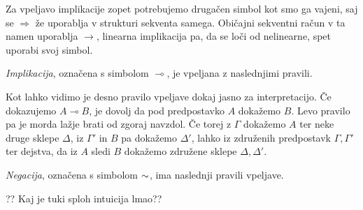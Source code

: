 Za vpeljavo implikacije zopet potrebujemo drugačen simbol kot smo ga vajeni, saj se $\Rightarrow$ že uporablja v strukturi sekventa samega. Običajni sekventni račun v ta namen uporablja $\rightarrow$, linearna implikacija pa, da se loči od nelinearne, spet uporabi svoj simbol.

\begin{definicija}
	\emph{Implikacija}, označena s simbolom $\multimap$, je vpeljana z naslednjimi pravili.
    \begin{center}
        \begin{bprooftree}
        \end{bprooftree}
        \begin{bprooftree}
        \end{bprooftree}
    \end{center}
    Kot lahko vidimo je desno pravilo vpeljave dokaj jasno za interpretacijo. Če dokazujemo $A \multimap B$, je dovolj da pod predpostavko $A$ dokažemo $B$. Levo pravilo pa je morda lažje brati od zgoraj navzdol. Če torej z $\Gamma$ dokažemo $A$ ter neke druge sklepe $\Delta$, iz $\Gamma'$ in $B$ pa dokažemo $\Delta'$, lahko iz združenih predpostavk $\Gamma,\Gamma'$ ter dejstva, da iz $A$ sledi $B$ dokažemo združene sklepe $\Delta,\Delta'$.
\end{definicija}

\begin{definicija}
    \emph{Negacija}, označena s simbolom $\negacija$, ima naslednji pravili vpeljave.
    \begin{center}
        \begin{bprooftree}
        \end{bprooftree}
        \begin{bprooftree}
        \end{bprooftree}
    \end{center}
    ?? Kaj je tuki sploh intuicija lmao??
\end{definicija}


